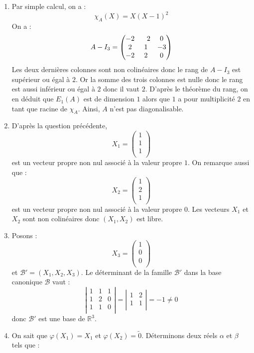 \documentclass[a4paper,10pt]{report}
\begin{document}
\begin{enumerate}
\item Par simple calcul, on a :
$$ \chi_A(X)=X(X-1)^2$$
On a :
$$ A-I_3 = \begin{pmatrix} -2 &\phantom-2 & 0 \cr 2 &1 &-3 \cr -2 &2 &0 \cr \end{pmatrix}$$
Les deux dernières colonnes sont non colinéaires donc le rang de $A-I_3$ est supérieur ou égal à $2$. Or la somme des trois colonnes est nulle donc le rang est aussi inférieur ou égal à $2$ donc il vaut $2$. D'après le théorème du rang, on en déduit que $E_1(A)$ est de dimension $1$ alors que $1$ a pour multiplicité $2$ en tant que racine de $\chi_A$. Ainsi, $A$ n'est pas diagonalisable.
\item D'après la question précédente, 
$$ X_1 = \begin{pmatrix}
1 \\
1 \\
1 \\
\end{pmatrix}$$ 
est un vecteur propre non nul associé à la valeur propre $1$.
On remarque aussi que :
$$ X_2 = \begin{pmatrix}
1 \\
2 \\
1 \\
\end{pmatrix}$$ 
est un vecteur propre non nul associé à la valeur propre $0$. Les vecteurs $X_1$ et $X_2$ sont non colinéaires donc $(X_1,X_2)$ est libre.
\item Posons :
$$ X_3 = \begin{pmatrix}
1 \\
0 \\
0  \\
\end{pmatrix}$$
et $\mathcal{B}'=(X_1,X_2,X_3)$. Le déterminant de la famille $\mathcal{B}'$ dans la base canonique $\mathcal{B}$ vaut :
$$ \left\vert \begin{array}{ccc}
1 & 1 & 1 \\
1 & 2 & 0 \\
1 & 1 & 0 \\
\end{array}\right\vert = \left\vert \begin{array}{cc}
1 & 2 \\
1 & 1 \\
\end{array}\right\vert = - 1 \neq 0$$
donc $\mathcal{B}'$ est une base de $\mathbb{R}^3$.
\item On sait que $\varphi(X_1)=X_1$ et $\varphi(X_2) = \tilde{0}$. Déterminons deux réels $\alpha$ et $\beta$ tels que :

\end{enumerate}
\end{document}
